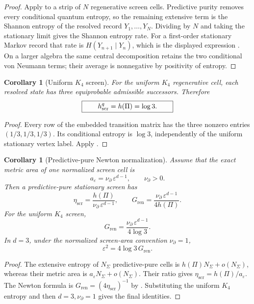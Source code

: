 \documentclass[11pt]{article}
\newtheorem{corollary}[theorem]{Corollary}
\theoremstyle{definition}
\theoremstyle{remark}
\newcommand{\eps}{\varepsilon}
\newcommand{\etaScr}{\eta_{\mathrm{scr}}}
\newcommand{\Gren}{G_{\mathrm{ren}}}
\newcommand{\Npartial}{\nu_{\partial}}
\begin{document}
\begin{proof}
Apply  to a strip of \(N\) regenerative screen
cells.  Predictive purity removes every conditional quantum entropy, so the
remaining extensive term is the Shannon entropy of the resolved record
\(Y_1,\ldots,Y_N\).  Dividing by \(N\) and taking the stationary limit gives the
Shannon entropy rate.  For a first-order stationary Markov record that rate is
\(H(Y_{n+1}\mid Y_n)\), which is the displayed expression
\cite{CoverThomas}.  On a larger algebra the same central decomposition retains
the two conditional von Neumann terms; their average is nonnegative by
positivity of entropy.
\end{proof}

\begin{corollary}[Uniform \(K_4\) screen]
\label{cor:uniform-k4-screen}
For the uniform \(K_4\) regenerative cell, each resolved state has three
equiprobable admissible successors.  Therefore
\[
 \boxed{\qquad h_{\rm scr}^{q}=h(\Pi)=\log3.\qquad}
\]
\end{corollary}

\begin{proof}
Every row of the embedded transition matrix has the three nonzero entries
\((1/3,1/3,1/3)\).  Its conditional entropy is \(\log3\), independently of the
uniform stationary vertex label.  Apply
.
\end{proof}

\begin{corollary}[Predictive-pure Newton normalization]
\label{cor:k4-newton-normalization}
Assume that the exact metric area of one normalized screen cell is
\[
   a_\eps=\Npartial\,\eps^{d-1},
   \qquad \Npartial>0.
\]
Then a predictive-pure stationary screen has
\[
 \boxed{\quad
 \etaScr=\frac{h(\Pi)}{\Npartial\,\eps^{d-1}},
 \qquad
 \Gren=\frac{\Npartial\,\eps^{d-1}}{4h(\Pi)}.
 \quad}
\]
For the uniform \(K_4\) screen,
\[
 \Gren=\frac{\Npartial\,\eps^{d-1}}{4\log3}.
\]
In \(d=3\), under the normalized screen-area convention
\(\Npartial=1\),
\[
 \boxed{\qquad
 \eps^2=4\log3\,\Gren.
 \qquad}
\]
\end{corollary}

\begin{proof}
The extensive entropy of \(N_\Sigma\) predictive-pure cells is
\(h(\Pi)N_\Sigma+o(N_\Sigma)\), whereas their metric area is
\(a_\eps N_\Sigma+o(N_\Sigma)\).  Their ratio gives
\(\etaScr=h(\Pi)/a_\eps\).  The Newton formula is
\(\Gren=(4\etaScr)^{-1}\) by
.  Substituting the uniform \(K_4\)
entropy and then \(d=3,\Npartial=1\) gives the final identities.
\end{proof}
\end{document}
